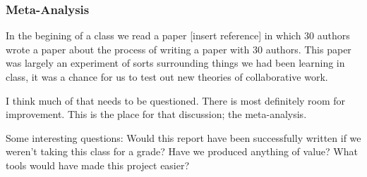 \subsubsection{Meta-Analysis}
In the begining of a class we read a paper [insert reference] in which 30 authors wrote a paper
about the process of writing a paper with 30 authors. This paper was largely an experiment of sorts
surrounding things we had been learning in class, it was a chance for us to test out new theories 
of collaborative work.

I think much of that needs to be questioned. There is most definitely room for improvement. This
is the place for that discussion; the meta-analysis.

Some interesting questions:
Would this report have been successfully written if we weren't taking this class for a grade?
Have we produced anything of value?
What tools would have made this project easier? 



